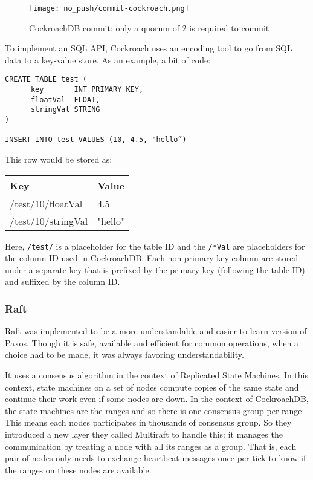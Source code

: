 \begin{figure}[H]
  \vspace{-10pt}
  \centering
  \centerline{\texttt{[image: no\_push/commit-cockroach.png]}}
  \vspace{-5pt}
  \caption{CockroachDB commit: only a quorum of 2 is required to commit }
  \vspace{-5pt}
  \label{fig:cockroachdb-commit}
\end{figure}

To implement an SQL API, Cockroach uses an encoding tool to go from SQL data to a key-value store\cite{CRDB:mapKV}. As an example, a bit of code:
\begin{verbatim}
CREATE TABLE test (
      key       INT PRIMARY KEY,
      floatVal  FLOAT,
      stringVal STRING
)

INSERT INTO test VALUES (10, 4.5, "hello”)
\end{verbatim}

This row would be stored as:

\begin{center}
\begin{tabular}{|l|l|}
\hline
Key & Value\\
\hline
/test/10/floatVal & 4.5\\
/test/10/stringVal & "hello"\\
\hline
\end{tabular}
\end{center}

Here, \verb~/test/~ is a placeholder for the table ID and the \verb~/*Val~ are placeholders for the column ID used in CockroachDB. Each non-primary key column are stored under a separate key that is prefixed by the primary key (following the table ID) and suffixed by the column ID.

\subsubsection{Raft}

Raft was implemented to be a more understandable and easier to learn version of Paxos\cite{DBLP:conf/usenix/OngaroO14}. Though it is safe, available and efficient for common operations, when a choice had to be made, it was always favoring understandability.


It uses a consensus algorithm in the context of Replicated State Machines. In this context, state machines on a set of nodes compute copies of the same state and continue their work even if some nodes are down. In the context of CockroachDB, the state machines are the ranges and so there is one consensus group per range. This means each nodes participates in thousands of consensus group. So they introduced a new layer they called Multiraft to handle this: it manages the communication by treating a node with all its ranges as a group. That is, each pair of nodes only needs to exchange heartbeat messages once per tick to know if the ranges on these nodes are available\cite{CRDB:multiraft}.

